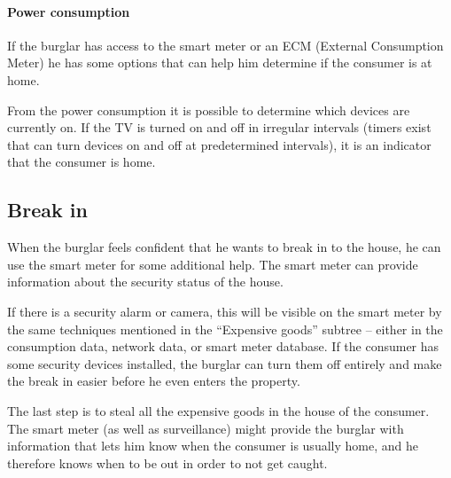 \paragraph{Power consumption}
If the burglar has access to the smart meter or an ECM (External Consumption Meter) he has some options that can help him determine if the consumer is at home.

From the power consumption it is possible to determine which devices are currently on. 
If the TV is turned on and off in irregular intervals (timers exist that can turn devices on and off at predetermined intervals), it is an indicator that the consumer is home.

\subsection{Break in}
When the burglar feels confident that he wants to break in to the house, he can use the smart meter for some additional help.
The smart meter can provide information about the security status of the house.

If there is a security alarm or camera, this will be visible on the smart meter by the same techniques mentioned in the ``Expensive goods'' subtree -- either in the consumption data, network data, or smart meter database.
If the consumer has some security devices installed, the burglar can turn them off entirely and make the break in easier before he even enters the property.

The last step is to steal all the expensive goods in the house of the consumer.
The smart meter (as well as surveillance) might provide the burglar with information that lets him know when the consumer is usually home, and he therefore knows when to be out in order to not get caught.
